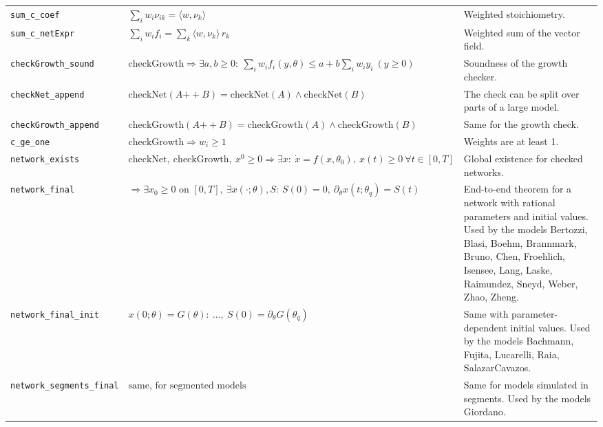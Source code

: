 {\begin{longtable}{@{}>{\raggedright\arraybackslash}p{3.6cm}>{\raggedright\arraybackslash}p{6.6cm}>{\raggedright\arraybackslash}p{5.6cm}@{}}
\texttt{sum\_\allowbreak{}c\_\allowbreak{}coef} & $\displaystyle \sum_iw_i\nu_{ik}=\langle w,\nu_k\rangle$ & Weighted stoichiometry. \\[3pt]
\texttt{sum\_\allowbreak{}c\_\allowbreak{}netExpr} & $\displaystyle \sum_iw_if_i=\sum_k\langle w,\nu_k\rangle\,r_k$ & Weighted sum of the vector field. \\[3pt]
\texttt{checkGrowth\_\allowbreak{}sound} & $\displaystyle \mathrm{checkGrowth}\Rightarrow\exists a,b\ge0:\ \sum_iw_if_i(y,\theta)\le a+b\sum_iw_iy_i\ (y\ge0)$ & Soundness of the growth checker. \\[3pt]
\texttt{checkNet\_\allowbreak{}append} & $\displaystyle \mathrm{checkNet}(A\mathbin{+\!\!+}B)=\mathrm{checkNet}(A)\wedge\mathrm{checkNet}(B)$ & The check can be split over parts of a large model. \\[3pt]
\texttt{checkGrowth\_\allowbreak{}append} & $\displaystyle \mathrm{checkGrowth}(A\mathbin{+\!\!+}B)=\mathrm{checkGrowth}(A)\wedge\mathrm{checkGrowth}(B)$ & Same for the growth check. \\[3pt]
\texttt{c\_\allowbreak{}ge\_\allowbreak{}one} & $\displaystyle \mathrm{checkGrowth}\Rightarrow w_i\ge1$ & Weights are at least 1. \\[3pt]
\texttt{network\_\allowbreak{}exists} & $\displaystyle \mathrm{checkNet},\ \mathrm{checkGrowth},\ x^0\ge0\Rightarrow\exists x:\ \dot x=f(x,\theta_0),\ x(t)\ge0\ \forall t\in[0,T]$ & Global existence for checked networks. \\[3pt]
\texttt{network\_\allowbreak{}final} & $\displaystyle \Rightarrow\exists x_0\ge0\text{ on }[0,T],\ \exists x(\cdot;\theta),S:\ S(0)=0,\ \partial_\theta x(t;\theta_q)=S(t)$ & End-to-end theorem for a network with rational parameters and initial values. Used by the models Bertozzi, Blasi, Boehm, Brannmark, Bruno, Chen, Froehlich, Isensee, Lang, Laske, Raimundez, Sneyd, Weber, Zhao, Zheng. \\[3pt]
\texttt{network\_\allowbreak{}final\_\allowbreak{}init} & $\displaystyle x(0;\theta)=G(\theta):\ \dots,\ S(0)=\partial_\theta G(\theta_q)$ & Same with parameter-dependent initial values. Used by the models Bachmann, Fujita, Lucarelli, Raia, SalazarCavazos. \\[3pt]
\texttt{network\_\allowbreak{}segments\_\allowbreak{}final} & $\displaystyle \text{same, for segmented models}$ & Same for models simulated in segments. Used by the models Giordano. \\[3pt]
\bottomrule
\end{longtable}
}

